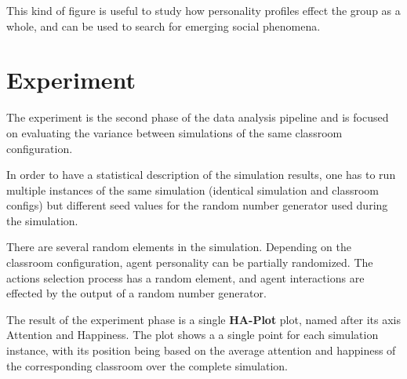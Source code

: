 This kind of figure is useful to study how personality profiles effect the group
as a whole, and can be used to search for emerging social phenomena.

\begin{figure}[]
    \label{ClassroomAggregates}
    \hspace*{-1.0\leftmargin}
\end{figure}



\section{Experiment}
The experiment is the second phase of the data analysis pipeline and is focused
on evaluating the variance between simulations of the same classroom configuration.

\begin{figure}[H]
\end{figure}

In order to have a statistical description of the simulation results, one has to
run multiple instances of the same simulation (identical simulation  and classroom
configs) but different seed values for the random number generator used during the simulation.

There are several random elements in the simulation. Depending on the classroom
configuration, agent personality can be partially randomized. The actions selection
process has a random element, and agent interactions are effected by the output of
a random number generator.

\bb

The result of the experiment phase is a single \textbf{HA-Plot} plot, named after
its axis Attention and Happiness. The plot shows a a single point for each simulation
instance, with its position being based on the average attention and happiness of
the corresponding classroom over the complete simulation.

